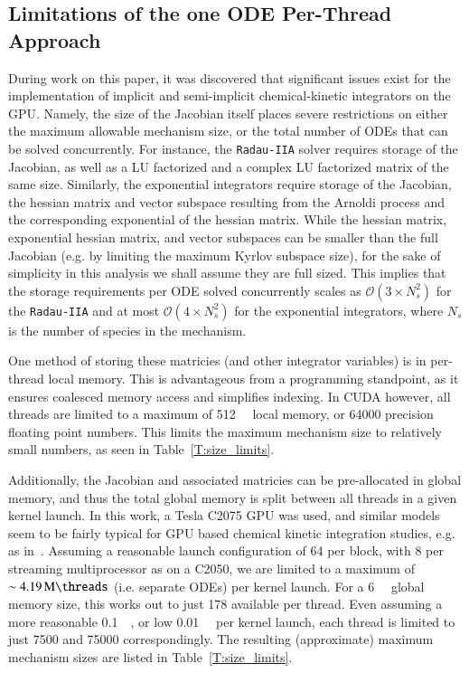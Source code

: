 \documentclass[preprint,12pt]{elsarticle}
\begin{document}
\subsection{Limitations of the one ODE Per-Thread Approach}
During work on this paper, it was discovered that significant issues exist for the implementation of implicit and semi-implicit chemical-kinetic integrators on the GPU.
Namely, the size of the Jacobian itself places severe restrictions on either the maximum allowable mechanism size, or the total number of ODEs that can be solved concurrently.
For instance, the \texttt{Radau-IIA} solver requires storage of the Jacobian, as well as a LU factorized and a complex LU factorized matrix of the same size.
Similarly, the exponential integrators require storage of the Jacobian, the hessian matrix and vector subspace resulting from the Arnoldi process and the corresponding exponential of the hessian matrix.
While the hessian matrix, exponential hessian matrix, and vector subspaces can be smaller than the full Jacobian (e.g. by limiting the maximum Kyrlov subspace size), for the sake of simplicity in this analysis we shall assume they are full sized.
This implies that the storage requirements per ODE solved concurrently scales as $\mathcal{O}\left(3 \times N_s^2\right)$ for the \texttt{Radau-IIA} and at most $\mathcal{O}\left(4 \times N_s^2\right)$ for the exponential integrators, where $N_s$ is the number of species in the mechanism.

One method of storing these matricies (and other integrator variables) is in per-thread local memory.
This is advantageous from a programming standpoint, as it ensures coalesced memory access and simplifies indexing.
In CUDA however, all threads are limited to a maximum of \SI{512}{\kilo\byte} local memory, or \SI{64000}{\double} precision floating point numbers.
This limits the maximum mechanism size to relatively small numbers, as seen in Table~\ref{T:size_limits}.

Additionally, the Jacobian and associated matricies can be pre-allocated in global memory, and thus the total global memory is split between all threads in a given kernel launch.
In this work, a Tesla C2075  GPU was used, and similar models seem to be fairly typical for GPU based chemical kinetic integration studies, e.g. as in~\cite{Shi:2011aa,Niemeyer:2011aa,Shi:2012aa,Le2013596,Stone:2013aa,Niemeyer:2014aa}.
Assuming a reasonable launch configuration of \SI{64}{\threads} per block, with \SI{8}{\blocks} per streaming multiprocessor as on a C2050, we are limited to a maximum of $\sim\SI{4.19}{\mega\threads}$ (i.e. separate ODEs) per kernel launch.
For a \SI{6}{\giga\byte} global memory size, this works out to just \SI{178}{\doubles} available per thread.
Even assuming a more reasonable \SI{0.1}{\mega\threads}, or low \SI{0.01}{\mega\threads} per kernel launch, each thread is limited to just \SI{7500}{\doubles} and \SI{75000}{\doubles} correspondingly.
The resulting (approximate) maximum mechanism sizes are listed in Table~\ref{T:size_limits}.
\end{document}
